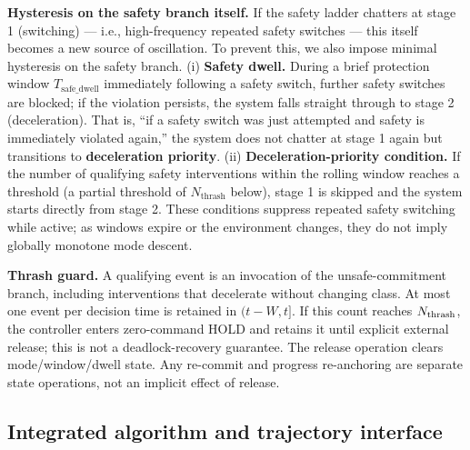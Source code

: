 \documentclass[11pt]{article}
\begin{document}
\textbf{Hysteresis on the safety branch itself.} If the safety ladder chatters at stage 1 (switching) --- i.e., high-frequency repeated safety switches --- this itself becomes a new source of oscillation. To prevent this, we also impose minimal hysteresis on the safety branch. (i) \textbf{Safety dwell.} During a brief protection window $T_{\text{safe\_dwell}}$ immediately following a safety switch, further safety switches are blocked; if the violation persists, the system falls straight through to stage 2 (deceleration). That is, ``if a safety switch was just attempted and safety is immediately violated again,'' the system does not chatter at stage 1 again but transitions to \textbf{deceleration priority}. (ii) \textbf{Deceleration-priority condition.} If the number of qualifying safety interventions within the rolling window reaches a threshold (a partial threshold of $N_{\text{thrash}}$ below), stage 1 is skipped and the system starts directly from stage 2. These conditions suppress repeated safety switching while active; as windows expire or the environment changes, they do not imply globally monotone mode descent.

\textbf{Thrash guard.} A qualifying event is an invocation of the unsafe-commitment branch, including interventions that decelerate without changing class. At most one event per decision time is retained in $(t-W,t]$. If this count reaches $N_{\rm thrash}$, the controller enters zero-command HOLD and retains it until explicit external release; this is not a deadlock-recovery guarantee. The release operation clears mode/window/dwell state. Any re-commit and progress re-anchoring are separate state operations, not an implicit effect of release.

\FloatBarrier
\subsection{Integrated algorithm and trajectory interface}
\end{document}
